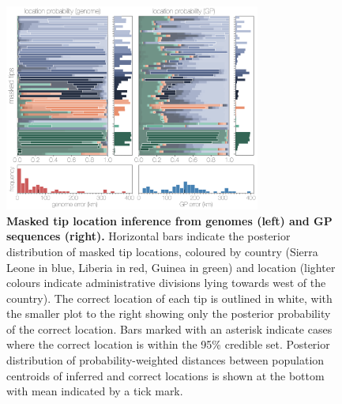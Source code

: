 \documentclass[11pt,oneside,letterpaper]{article}
\begin{document}
\begin{figure}[h]
 \centering
	\includegraphics[width=0.75\textwidth]{figures/fig3_locations.png}
	\caption{\textbf{Masked tip location inference from genomes (left) and GP sequences (right).}
  Horizontal bars indicate the posterior distribution of masked tip locations, coloured by country (Sierra Leone in blue, Liberia in red, Guinea in green) and location (lighter colours indicate administrative divisions lying towards west of the country).
  The correct location of each tip is outlined in white, with the smaller plot to the right showing only the posterior probability of the correct location.
  Bars marked with an asterisk indicate cases where the correct location is within the 95\% credible set.
  Posterior distribution of probability-weighted distances between population centroids of inferred and correct locations is shown at the bottom with mean indicated by a tick mark.
	}
	\label{locations}
\end{figure}
\end{document}
